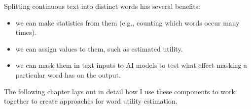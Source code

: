 \begin{description}
	      Splitting continuous text into distinct words has several benefits:
	      \begin{itemize}
		      \item we can make statistics from them (e.g., counting which words occur many times).
		      \item we can assign values to them, such as estimated utility.
		      \item we can mask them in text inputs to AI models to test what effect masking a particular word has on the output.
	      \end{itemize}
\end{description}

The following chapter lays out in detail how I use these components to work together to create approaches for word utility estimation.
